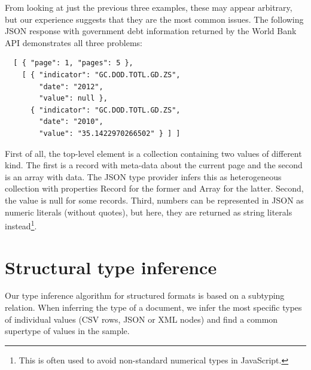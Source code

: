 \documentclass[preprint]{sigplanconf}
\newcommand{\kvd}[1]{\textnormal{\textcolor{kvdclr}{\sffamily #1}}}
\newcommand{\ident}[1]{\textnormal{\sffamily #1}}
\begin{document}
From looking at just the previous three examples, these may appear arbitrary, but our experience
suggests that they are the most common issues. The following JSON response with government debt
information returned by the World Bank API demonstrates all three problems:
%
{\small{
\begin{verbatim}
  [ { "page": 1, "pages": 5 },
    [ { "indicator": "GC.DOD.TOTL.GD.ZS",
        "date": "2012",
        "value": null },
      { "indicator": "GC.DOD.TOTL.GD.ZS",
        "date": "2010",
        "value": "35.1422970266502" } ] ]
\end{verbatim}
}}
%
\noindent
First of all, the top-level element is a collection containing two values of different kind.
The first is a record with meta-data about the current page and the second is an array with data. 
The JSON type provider infers this as heterogeneous collection with properties \ident{Record}
for the former and \ident{Array} for the latter. Second, the \ident{value} is \kvd{null} for some
records. Third, numbers can be represented in JSON as numeric literals (without quotes), but
here, they are returned as string literals instead\footnote{This is often used to avoid non-standard
numerical types in JavaScript.}.


%
%

\section{Structural type inference}
\label{sec:inference}

Our type inference algorithm for structured formats is based on a subtyping relation. When 
inferring the type of a document, we infer the most specific types of individual values (CSV rows,
JSON or XML nodes) and find a common supertype of values in the sample.
\end{document}
